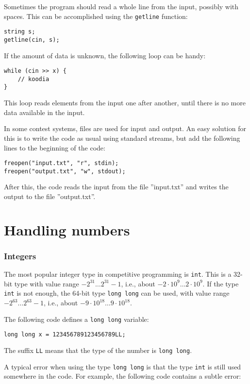 Sometimes the program should read a whole line
from the input, possibly with spaces.
This can be accomplished using the
\texttt{getline} function:

\begin{lstlisting}
string s;
getline(cin, s);
\end{lstlisting}

If the amount of data is unknown, the following
loop can be handy:
\begin{lstlisting}
while (cin >> x) {
    // koodia
}
\end{lstlisting}
This loop reads elements from the input
one after another, until there is no
more data available in the input.

In some contest systems, files are used for
input and output.
An easy solution for this is to write
the code as usual using standard streams,
but add the following lines to the beginning of the code:
\begin{lstlisting}
freopen("input.txt", "r", stdin);
freopen("output.txt", "w", stdout);
\end{lstlisting}
After this, the code reads the input from the file
''input.txt'' and writes the output to the file
''output.txt''.

\section{Handling numbers}


\subsubsection{Integers}

The most popular integer type in competitive programming
is \texttt{int}. This is a 32-bit type with
value range $-2^{31} \ldots 2^{31}-1$,
i.e., about $-2 \cdot 10^9 \ldots 2 \cdot 10^9$.
If the type \texttt{int} is not enough,
the 64-bit type \texttt{long long} can be used,
with value range $-2^{63} \ldots 2^{63}-1$,
i.e., about $-9 \cdot 10^{18} \ldots 9 \cdot 10^{18}$.

The following code defines a
\texttt{long long} variable:
\begin{lstlisting}
long long x = 123456789123456789LL;
\end{lstlisting}
The suffix \texttt{LL} means that the
type of the number is \texttt{long long}.

A typical error when using the type \texttt{long long}
is that the type \texttt{int} is still used somewhere
in the code.
For example, the following code contains
a subtle error:

